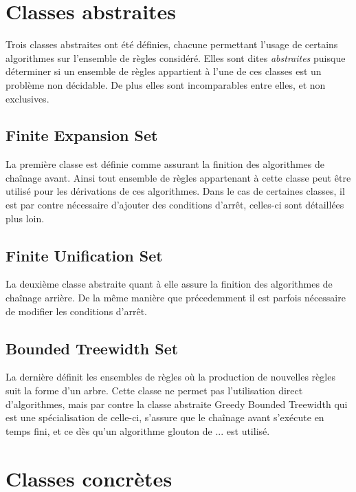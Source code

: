 
\section{Classes abstraites}\label{classes_abstraites}
Trois classes abstraites ont été définies, chacune permettant l'usage de certains
algorithmes sur l'ensemble de règles considéré.
Elles sont dites {\em abstraites} puisque déterminer si un ensemble de règles appartient
à l'une de ces classes est un problème non décidable.
De plus elles sont incomparables entre elles, et non exclusives. 

\subsection{Finite Expansion Set}\label{classes_abstraites_fus}
La première classe est définie comme assurant la finition des algorithmes de chaînage
avant. Ainsi tout ensemble de règles appartenant à cette classe peut être utilisé pour
les dérivations de ces algorithmes.
Dans le cas de certaines classes, il est par contre nécessaire d'ajouter des conditions
d'arrêt, celles-ci sont détaillées plus loin.

\subsection{Finite Unification Set}\label{classes_abstraites_fes}
La deuxième classe abstraite quant à elle assure la finition des algorithmes de chaînage
arrière. De la même manière que précedemment il est parfois nécessaire de modifier les
conditions d'arrêt.

\subsection{Bounded Treewidth Set}\label{classes_abstraites_bts}
La dernière définit les ensembles de règles où la production de nouvelles règles suit la
forme d'un arbre.
Cette classe ne permet pas l'utilisation direct d'algorithmes, mais par contre la classe
abstraite Greedy Bounded Treewidth qui est une spécialisation de celle-ci, s'assure que
le chaînage avant s'exécute en temps fini, et ce dès qu'un algorithme glouton de ... est
utilisé.


\section{Classes concrètes}\label{classes_concretes}

